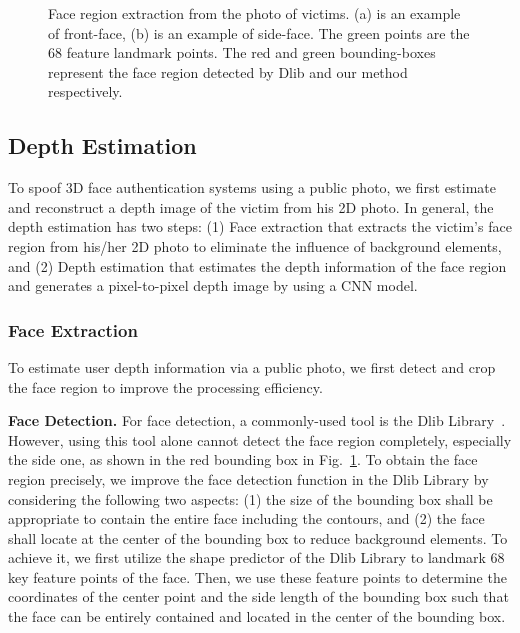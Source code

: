 \begin{figure}[pt]
	\centering
	\vspace{-0.1in}
	\caption{Face region extraction from the photo of victims. (a) is an example of front-face, (b) is an example of side-face. The green points are the 68 feature landmark points. The red and green bounding-boxes represent the face region detected by Dlib and our method respectively.}
	\label{face_extraction}
	\vspace{-0.15in}
\end{figure}

\subsection{Depth Estimation}
To spoof 3D face authentication systems using a  public photo, we first estimate and reconstruct a depth image of the victim from his 2D photo. In general, the depth estimation has two steps: (1) Face extraction that extracts the victim's face region from his/her 2D photo to eliminate the influence of background elements, and (2) Depth estimation that estimates the depth information of the face region and generates a pixel-to-pixel depth image by using a CNN model.

\subsubsection{Face Extraction}
To estimate user depth information via a public photo, we first  detect and crop the face region to  improve the processing efficiency.

\textbf{Face Detection.} For face detection, a commonly-used  tool is the Dlib Library~\cite{dlib09}. However, using this tool alone cannot detect the  face region completely, especially the side one, as shown in the red bounding box in Fig.~\ref{face_extraction}.
To obtain the face region precisely, we improve the face detection function in the  Dlib Library by considering the following two aspects: (1) the size of the bounding box shall be appropriate to contain the entire face including the contours, and (2) the face shall  locate at the center of the bounding box to reduce background elements. To achieve it, we first utilize the shape predictor of the Dlib Library to landmark 68 key feature points of the face. Then, we use these feature points to determine the  coordinates of the center point and the side length of the bounding box such that the face can be entirely contained and located in the center of the bounding box. 

